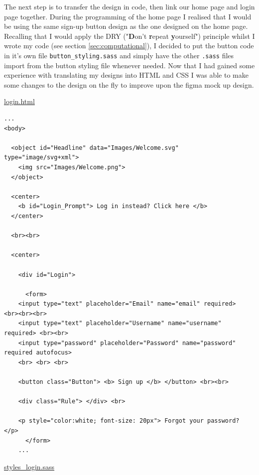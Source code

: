 The next step is to transfer the design in code, then link
our home page and login page together. During the programming
of the home page I realised that I would be using the same
sign-up button design as the one designed on the home page.
Recalling that I would apply the DRY
("\textbf{D}on't \textbf{r}epeat \textbf{y}ourself") principle
whilst I wrote my code (see section \ref{sec:computational}),
I decided to put the button code in it's own file
\texttt{button\_styling.sass} and simply have the other \texttt{.sass}
files import from the button styling file whenever needed. Now
that I had gained some experience with translating my designs into
HTML and CSS I was able to make some changes to the design on the
fly to improve upon the figma mock up design. \\ \vspace{0.2cm}

\underline{login.html}

\begin{verbatim}
...
<body>

  <object id="Headline" data="Images/Welcome.svg" type="image/svg+xml">
    <img src="Images/Welcome.png">
  </object>

  <center>
    <b id="Login_Prompt"> Log in instead? Click here </b>
  </center>

  <br><br>

  <center>

    <div id="Login">

      <form>
	<input type="text" placeholder="Email" name="email" required>       <br><br><br>
	<input type="text" placeholder="Username" name="username" required> <br><br>
	<input type="password" placeholder="Password" name="password" required autofocus>
	<br> <br> <br>

	<button class="Button"> <b> Sign up </b> </button> <br><br>

	<div class="Rule"> </div> <br>

	<p style="color:white; font-size: 20px"> Forgot your password? </p>
      </form>
    ...
\end{verbatim}

\underline{styles\_login.sass}

